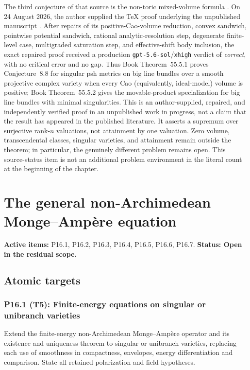 \documentclass[11pt,a4paper]{article}
\theoremstyle{definition}
\theoremstyle{remark}
\begin{document}
The third conjecture of that source is the non-toric mixed-volume formula
\cite[Conjecture~8.8]{Xia21}.  On 24 August 2026, the author supplied the TeX
proof underlying the unpublished manuscript \cite{XiaMVOB}.  After repairs
of its positive-Cao-volume reduction, convex sandwich, pointwise potential
sandwich, rational analytic-resolution step, degenerate finite-level case,
multigraded saturation step, and effective-shift body inclusion, the exact
repaired proof received a production \texttt{gpt-5.6-sol}/\texttt{xhigh}
verdict of \emph{correct}, with no critical error and no gap.  Thus
Book Theorem~55.5.1 proves Conjecture~8.8 for singular psh metrics on
big line bundles over a smooth projective complex variety when every Cao
(equivalently, ideal-model) volume is positive;
Book Theorem~55.5.2 gives the movable-product specialization for
big line bundles with minimal singularities.  This is an author-supplied,
repaired, and independently verified proof in an unpublished work in
progress, not a claim that the result has appeared in the published
literature.  It asserts a supremum over surjective rank-\(n\) valuations,
not attainment by one valuation.  Zero volume, transcendental classes,
singular varieties, and attainment remain outside the theorem; in
particular, the genuinely different problem
 remains open.
This source-status item is not an additional problem environment in the
literal count at the beginning of the chapter.

\clearpage\section{The general non-Archimedean Monge--Ampère equation}
\label{family:10}
\noindent\textbf{Active items:} P16.1, P16.2, P16.3, P16.4, P16.5, P16.6, P16.7. \textbf{Status: Open in the residual scope.}

\subsection{Atomic targets}
\subsubsection*{P16.1 (T5): Finite-energy equations on singular or unibranch varieties}
\label{atom:P16.1}
Extend the finite-energy non-Archimedean Monge--Ampère operator and its existence-and-uniqueness theorem to singular or unibranch varieties, replacing each use of smoothness in compactness, envelopes, energy differentiation and comparison. State all retained polarization and field hypotheses.
\end{document}
